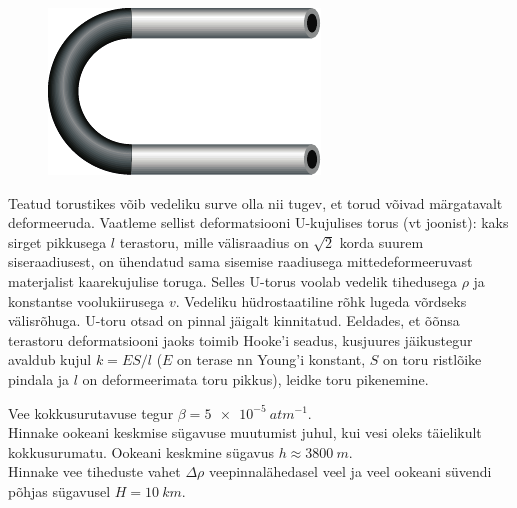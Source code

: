 \documentclass[10pt]{article}
\begin{document}
{
\begin{figure}
	\begin{center}
		\vspace{-15pt}
		\includegraphics[width=\linewidth]{2009-lahg-06-yl}
	\end{center}
\end{figure}
Teatud torustikes võib vedeliku surve olla nii tugev, et torud võivad märgatavalt deformeeruda. Vaatleme sellist deformatsiooni U-kujulises torus (vt joonist): kaks sirget pikkusega $l$ terastoru, mille välisraadius on $\sqrt 2$ korda suurem siseraadiusest, on ühendatud sama sisemise raadiusega mittedeformeeruvast materjalist kaarekujulise toruga. Selles U-torus voolab vedelik tihedusega $\rho$ ja konstantse voolukiirusega $v$. Vedeliku hüdrostaatiline rõhk lugeda võrdseks välisrõhuga. U-toru otsad on pinnal jäigalt kinnitatud. Eeldades, et õõnsa terastoru deformatsiooni jaoks toimib Hooke’i seadus, kusjuures jäikustegur avaldub kujul $k = ES/l$ ($E$ on terase nn Young’i konstant, $S$ on toru ristlõike pindala ja $l$ on deformeerimata toru pikkus), leidke toru pikenemine.
\probend
\bigskip


Vee kokkusurutavuse tegur $\beta = \SI{5e-5}{atm^{-1}}$.\\
\osa Hinnake ookeani keskmise sügavuse muutumist juhul, kui vesi oleks täielikult kokkusurumatu. Ookeani keskmine sügavus $h \approx \SI{3800}{m}$.\\
\osa Hinnake vee tiheduste vahet $\Delta \rho$ veepinnalähedasel veel ja veel ookeani süvendi põhjas sügavusel $H = \SI{10}{km}$. 

}
\end{document}
